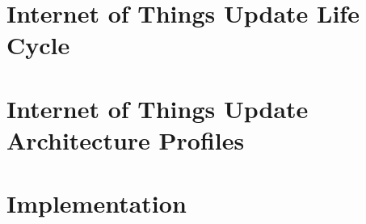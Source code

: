 \documentclass{kththesis}
\begin{document}
\chapter{Internet of Things Update Life Cycle}


\chapter{Internet of Things Update\\Architecture Profiles}


\chapter{Implementation}


\printbibliography[heading=bibintoc] %


\end{document}
